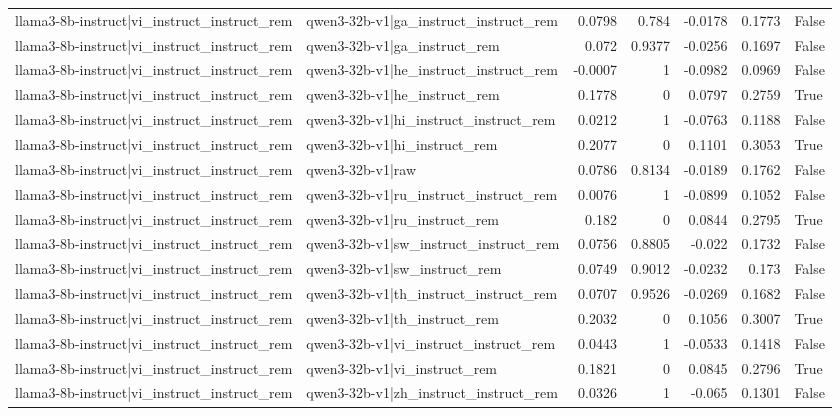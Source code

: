 \begin{table}
\begin{tabular}{l l r r r r l}
llama3-8b-instruct|vi_instruct_instruct_rem & qwen3-32b-v1|ga_instruct_instruct_rem & 0.0798 & 0.784 & -0.0178 & 0.1773 & False \\
llama3-8b-instruct|vi_instruct_instruct_rem & qwen3-32b-v1|ga_instruct_rem & 0.072 & 0.9377 & -0.0256 & 0.1697 & False \\
llama3-8b-instruct|vi_instruct_instruct_rem & qwen3-32b-v1|he_instruct_instruct_rem & -0.0007 & 1 & -0.0982 & 0.0969 & False \\
llama3-8b-instruct|vi_instruct_instruct_rem & qwen3-32b-v1|he_instruct_rem & 0.1778 & 0 & 0.0797 & 0.2759 & True \\
llama3-8b-instruct|vi_instruct_instruct_rem & qwen3-32b-v1|hi_instruct_instruct_rem & 0.0212 & 1 & -0.0763 & 0.1188 & False \\
llama3-8b-instruct|vi_instruct_instruct_rem & qwen3-32b-v1|hi_instruct_rem & 0.2077 & 0 & 0.1101 & 0.3053 & True \\
llama3-8b-instruct|vi_instruct_instruct_rem & qwen3-32b-v1|raw & 0.0786 & 0.8134 & -0.0189 & 0.1762 & False \\
llama3-8b-instruct|vi_instruct_instruct_rem & qwen3-32b-v1|ru_instruct_instruct_rem & 0.0076 & 1 & -0.0899 & 0.1052 & False \\
llama3-8b-instruct|vi_instruct_instruct_rem & qwen3-32b-v1|ru_instruct_rem & 0.182 & 0 & 0.0844 & 0.2795 & True \\
llama3-8b-instruct|vi_instruct_instruct_rem & qwen3-32b-v1|sw_instruct_instruct_rem & 0.0756 & 0.8805 & -0.022 & 0.1732 & False \\
llama3-8b-instruct|vi_instruct_instruct_rem & qwen3-32b-v1|sw_instruct_rem & 0.0749 & 0.9012 & -0.0232 & 0.173 & False \\
llama3-8b-instruct|vi_instruct_instruct_rem & qwen3-32b-v1|th_instruct_instruct_rem & 0.0707 & 0.9526 & -0.0269 & 0.1682 & False \\
llama3-8b-instruct|vi_instruct_instruct_rem & qwen3-32b-v1|th_instruct_rem & 0.2032 & 0 & 0.1056 & 0.3007 & True \\
llama3-8b-instruct|vi_instruct_instruct_rem & qwen3-32b-v1|vi_instruct_instruct_rem & 0.0443 & 1 & -0.0533 & 0.1418 & False \\
llama3-8b-instruct|vi_instruct_instruct_rem & qwen3-32b-v1|vi_instruct_rem & 0.1821 & 0 & 0.0845 & 0.2796 & True \\
llama3-8b-instruct|vi_instruct_instruct_rem & qwen3-32b-v1|zh_instruct_instruct_rem & 0.0326 & 1 & -0.065 & 0.1301 & False \\

\end{tabular}
\end{table}

